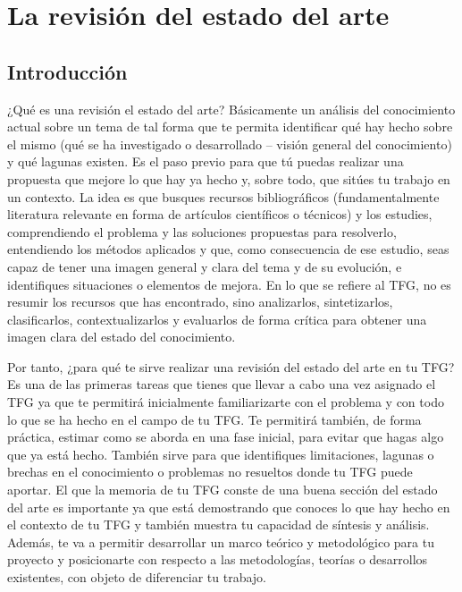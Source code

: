 \chapter{La revisión del estado del arte} \label{cap:RevisionEstadoDelArte}


\section{Introducción}
¿Qué es una revisión el estado del arte? Básicamente un análisis del conocimiento actual sobre un tema de tal forma que te permita identificar qué hay hecho sobre el mismo (qué se ha investigado o desarrollado -- visión general del conocimiento) y qué lagunas existen. Es el paso previo para que tú puedas realizar una propuesta que mejore lo que hay ya hecho y, sobre todo, que sitúes tu trabajo en un contexto. La idea es que busques recursos bibliográficos (fundamentalmente literatura relevante en forma de artículos científicos o técnicos) y los estudies, comprendiendo el problema y las soluciones propuestas para resolverlo, entendiendo los métodos aplicados y que, como consecuencia de ese estudio, seas capaz de tener una imagen general y clara del tema y de su evolución, e identifiques situaciones o elementos de mejora. En lo que se refiere al TFG, no es resumir los recursos que has encontrado, sino analizarlos, sintetizarlos, clasificarlos, contextualizarlos y evaluarlos de forma crítica para obtener una imagen clara del estado del conocimiento.

Por tanto, ¿para qué te sirve realizar una revisión del estado del arte en tu TFG? Es una de las primeras tareas que tienes que llevar a cabo una vez asignado el TFG ya que te permitirá inicialmente familiarizarte con el problema y con todo lo que se ha hecho en el campo de tu TFG. Te permitirá también,  de forma práctica, estimar como se aborda en una fase inicial, para evitar que hagas algo que ya está hecho. También sirve para que identifiques limitaciones, lagunas o brechas en el conocimiento o problemas no resueltos donde tu TFG puede aportar. El que la memoria de tu TFG conste de una buena sección del estado del arte es importante ya que está demostrando que conoces lo que hay hecho en el contexto de tu TFG y también muestra tu capacidad de síntesis y análisis. Además, te va a permitir desarrollar un marco teórico y metodológico para tu proyecto y posicionarte con respecto a las metodologías, teorías o desarrollos existentes, con objeto de diferenciar tu trabajo. 


